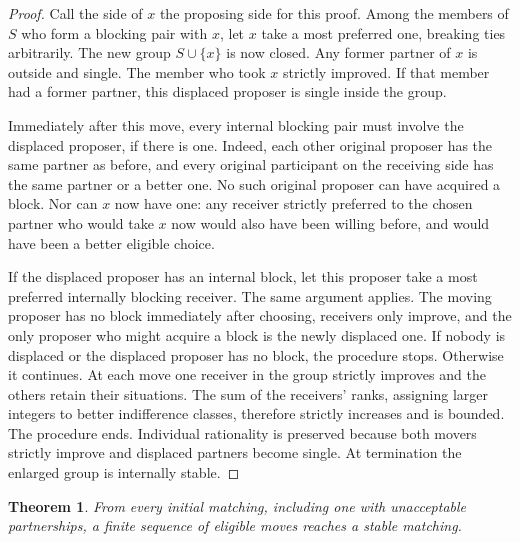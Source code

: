 \documentclass[11pt]{article}
\newtheorem{theorem}{Theorem}
\begin{document}
\begin{proof}
Call the side of \(x\) the proposing side for this proof. Among the members of \(S\) who form a blocking pair with \(x\), let \(x\) take a most preferred one, breaking ties arbitrarily. The new group \(S\cup\{x\}\) is now closed. Any former partner of \(x\) is outside and single. The member who took \(x\) strictly improved. If that member had a former partner, this displaced proposer is single inside the group.

Immediately after this move, every internal blocking pair must involve the displaced proposer, if there is one. Indeed, each other original proposer has the same partner as before, and every original participant on the receiving side has the same partner or a better one. No such original proposer can have acquired a block. Nor can \(x\) now have one: any receiver strictly preferred to the chosen partner who would take \(x\) now would also have been willing before, and would have been a better eligible choice.

If the displaced proposer has an internal block, let this proposer take a most preferred internally blocking receiver. The same argument applies. The moving proposer has no block immediately after choosing, receivers only improve, and the only proposer who might acquire a block is the newly displaced one. If nobody is displaced or the displaced proposer has no block, the procedure stops. Otherwise it continues. At each move one receiver in the group strictly improves and the others retain their situations. The sum of the receivers' ranks, assigning larger integers to better indifference classes, therefore strictly increases and is bounded. The procedure ends. Individual rationality is preserved because both movers strictly improve and displaced partners become single. At termination the enlarged group is internally stable.
\end{proof}

\begin{theorem}
From every initial matching, including one with unacceptable partnerships, a finite sequence of eligible moves reaches a stable matching.
\end{theorem}
\end{document}
